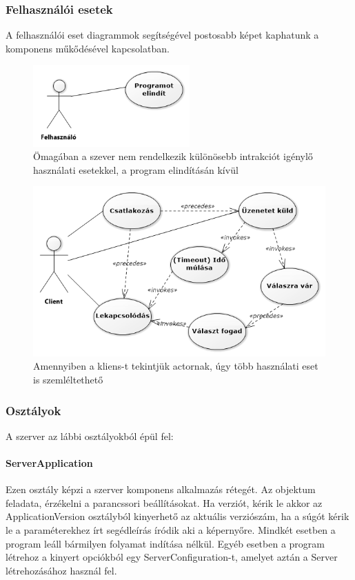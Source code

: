 \documentclass[12pt]{report}
\begin{document}
\subsubsection{Felhasználói esetek}
A felhasználói eset diagrammok segítségével postosabb képet kaphatunk a komponens műkődésével kapcsolatban.

  \begin{figure}[ht]
       \centering
    \includegraphics[width=6cm]{pics/uc.png}
	  \caption{Ömagában a szever nem rendelkezik különösebb intrakciót igénylő használati esetekkel, a program elindításán kívül}
  \end{figure}
  
    \begin{figure}[ht]
       \centering
    \includegraphics[width=15cm]{pics/client_serv_u_c.png}
	  \caption{Amennyiben a kliens-t tekintjük actornak, úgy több használati eset is szemléltethető}
  \end{figure}
  
\subsubsection{Osztályok}
A szerver az lábbi osztályokból épül fel:
  \paragraph{ServerApplication}
  
  Ezen osztály képzi a szerver komponens alkalmazás rétegét. Az objektum feladata, érzékelni a parancssori beállításokat. Ha verziót, kérik le akkor az ApplicationVersion osztályból kinyerhető az aktuális verziószám, ha a súgót kérik le a paraméterekhez írt segédleírás íródik aki a képernyőre. Mindkét esetben a program leáll bármilyen folyamat indítása nélkül.
  Egyéb esetben a program létrehoz a kinyert opciókból egy ServerConfiguration-t, amelyet aztán a Server létrehozásához használ fel.
\end{document}
